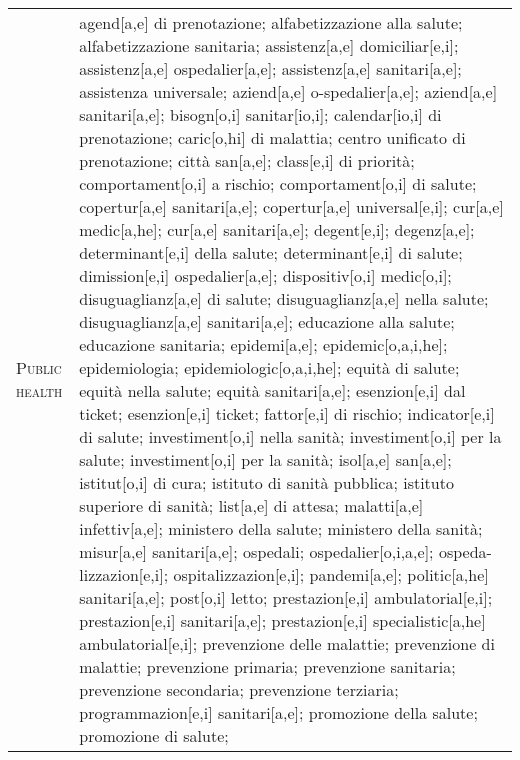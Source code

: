 \begin{table*}
{\begin{tabular}{p{2cm}p{16.5cm}}
        \textsc{Public health} & 
        agend[a,e] di prenotazione; 
        alfabetizzazione alla salute; 
        alfabetizzazione sanitaria; 
        assistenz[a,e] domiciliar[e,i]; 
        assistenz[a,e] ospedalier[a,e]; 
        assistenz[a,e] sanitari[a,e]; 
        assistenza universale; 
        aziend[a,e] o-spedalier[a,e]; 
        aziend[a,e] sanitari[a,e]; 
        bisogn[o,i] sanitar[io,i]; 
        calendar[io,i] di prenotazione; 
        caric[o,hi] di malattia; 
        centro unificato di prenotazione; 
        città san[a,e]; 
        class[e,i] di priorità; 
        comportament[o,i] a rischio; 
        comportament[o,i] di salute; 
        copertur[a,e] sanitari[a,e]; 
        copertur[a,e] universal[e,i]; 
        cur[a,e] medic[a,he]; 
        cur[a,e] sanitari[a,e]; 
        degent[e,i]; 
        degenz[a,e]; 
        determinant[e,i] della salute; 
        determinant[e,i] di salute; 
        dimission[e,i] ospedalier[a,e]; 
        dispositiv[o,i] medic[o,i]; 
        disuguaglianz[a,e] di salute; 
        disuguaglianz[a,e] nella salute; 
        disuguaglianz[a,e] sanitari[a,e]; 
        educazione alla salute; 
        educazione sanitaria; 
        epidemi[a,e]; 
        epidemic[o,a,i,he]; 
        epidemiologia; 
        epidemiologic[o,a,i,he]; 
        equità di salute; 
        equità nella salute; 
        equità sanitari[a,e]; 
        esenzion[e,i] dal ticket; 
        esenzion[e,i] ticket; 
        fattor[e,i] di rischio; 
        indicator[e,i] di salute; 
        investiment[o,i] nella sanità; 
        investiment[o,i] per la salute; 
        investiment[o,i] per la sanità; 
        isol[a,e] san[a,e]; 
        istitut[o,i] di cura; 
        istituto di sanità pubblica; 
        istituto superiore di sanità; 
        list[a,e] di attesa; 
        malatti[a,e] infettiv[a,e]; 
        ministero della salute; 
        ministero della sanità; 
        misur[a,e] sanitari[a,e]; 
        ospedali; 
        ospedalier[o,i,a,e]; 
        ospeda-lizzazion[e,i]; 
        ospitalizzazion[e,i]; 
        pandemi[a,e]; 
        politic[a,he] sanitari[a,e]; 
        post[o,i] letto; 
        prestazion[e,i] ambulatorial[e,i]; 
        prestazion[e,i] sanitari[a,e]; 
        prestazion[e,i] specialistic[a,he] ambulatorial[e,i]; %
        prevenzione delle malattie; 
        prevenzione di malattie; 
        prevenzione primaria; 
        prevenzione sanitaria; 
        prevenzione secondaria; 
        prevenzione terziaria; 
        programmazion[e,i] sanitari[a,e]; 
        promozione della salute; 
        promozione di salute; 

\end{tabular}}
\end{table*}

